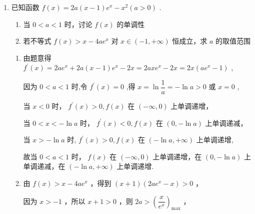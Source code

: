 \begin{enumerate}
\begin{enumerate}
\begin{jieda}
\begin{dingautolist}{172}
                综上，$a \in \left(-\infty, \dfrac{e}{2}\right]$
            \end{dingautolist}
        \end{jieda}
        
        \item 已知函数 $f\left( x\right)  = {2a}\left( {x - 1}\right) {{e}}^{x} - {x}^{2}\left( {a > 0}\right)$ .
        \begin{enumerate}
            \item 当 $0 < a < 1$ 时，讨论 $f\left( x\right)$ 的单调性
            \item 若不等式 $f\left( x\right)  > x - {4a}{{e}}^{x}$ 对 $x \in  \left( {-1, + \infty }\right)$ 恒成立，求 $a$ 的取值范围
        \end{enumerate}

        \begin{jieda}
            \begin{enumerate}
                \item 由题意得 ${f}^{\prime }\left( x\right)  = {2a}{{e}}^{x} + {2a}\left( {x - 1}\right) {{e}}^{x} - {2x} = {2ax}{{e}}^{x} - {2x} = {2x}\left( {a{{e}}^{x} - 1}\right)$ ,
                
                因为 $0 < a < 1$ 时,令 ${f}^{\prime }\left( x\right)  = 0$ ,得 $x = \ln \dfrac{1}{a} =  - \ln a > 0$ 或 $x = 0$ ,
                
                当 $x < 0$ 时， ${f}^{\prime }\left( x\right)  > 0,f\left( x\right)$ 在 $\left( {-\infty ,0}\right)$ 上单调递增，
                
                当 $0 < x <  - \ln a$ 时， ${f}^{\prime }\left( x\right)  < 0,f\left( x\right)$ 在 $\left( {0, - \ln a}\right)$ 上单调递减，
                
                当 $x >  - \ln a$ 时, ${f}^{\prime }\left( x\right)  > 0,f\left( x\right)$ 在 $\left( {-\ln a, + \infty }\right)$ 上单调递增,
                
                故当 $0 < a < 1$ 时， $f\left( x\right)$ 在 $\left( {-\infty ,0}\right)$ 上单调递增，在 $\left( {0, - \ln a}\right)$ 上单调递减，在 $\left( {-\ln a, + \infty }\right)$ 上单调递增.

                \item 由 $f\left( x\right)  > x - {4a}{{e}}^{x}$ ，得到 $\left( {x + 1}\right) \left( {{2a}{{e}}^{x} - x}\right)  > 0$ ，
                
                因为 $x >  - 1$ ，所以 $x + 1 > 0$ ，则 ${2a} > {\left( \dfrac{x}{{{e}}^{x}}\right) }_{\max }$ ，
                

\end{enumerate}
\end{jieda}
\end{enumerate}
\end{enumerate}
